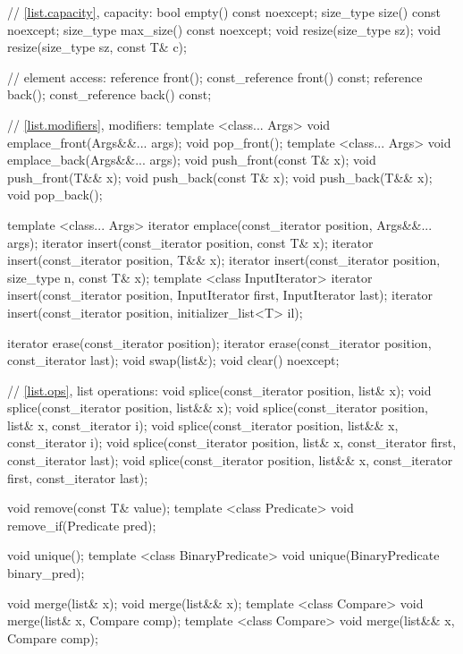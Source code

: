 \begin{codeblock}
{{    // \ref{list.capacity}, capacity:
    bool      empty() const noexcept;
    size_type size() const noexcept;
    size_type max_size() const noexcept;
    void      resize(size_type sz);
    void      resize(size_type sz, const T& c);

    // element access:
    reference       front();
    const_reference front() const;
    reference       back();
    const_reference back() const;

    // \ref{list.modifiers}, modifiers:
    template <class... Args> void emplace_front(Args&&... args);
    void pop_front();
    template <class... Args> void emplace_back(Args&&... args);
    void push_front(const T& x);
    void push_front(T&& x);
    void push_back(const T& x);
    void push_back(T&& x);
    void pop_back();

    template <class... Args> iterator emplace(const_iterator position, Args&&... args);
    iterator insert(const_iterator position, const T& x);
    iterator insert(const_iterator position, T&& x);
    iterator insert(const_iterator position, size_type n, const T& x);
    template <class InputIterator>
      iterator insert(const_iterator position, InputIterator first,
                      InputIterator last);
    iterator insert(const_iterator position, initializer_list<T> il);

    iterator erase(const_iterator position);
    iterator erase(const_iterator position, const_iterator last);
    void     swap(list&);
    void     clear() noexcept;

    // \ref{list.ops}, list operations:
    void splice(const_iterator position, list& x);
    void splice(const_iterator position, list&& x);
    void splice(const_iterator position, list& x, const_iterator i);
    void splice(const_iterator position, list&& x, const_iterator i);
    void splice(const_iterator position, list& x,
                const_iterator first, const_iterator last);
    void splice(const_iterator position, list&& x,
                const_iterator first, const_iterator last);

    void remove(const T& value);
    template <class Predicate> void remove_if(Predicate pred);

    void unique();
    template <class BinaryPredicate>
      void unique(BinaryPredicate binary_pred);

    void merge(list& x);
    void merge(list&& x);
    template <class Compare> void merge(list& x, Compare comp);
    template <class Compare> void merge(list&& x, Compare comp);

}}
\end{codeblock}
